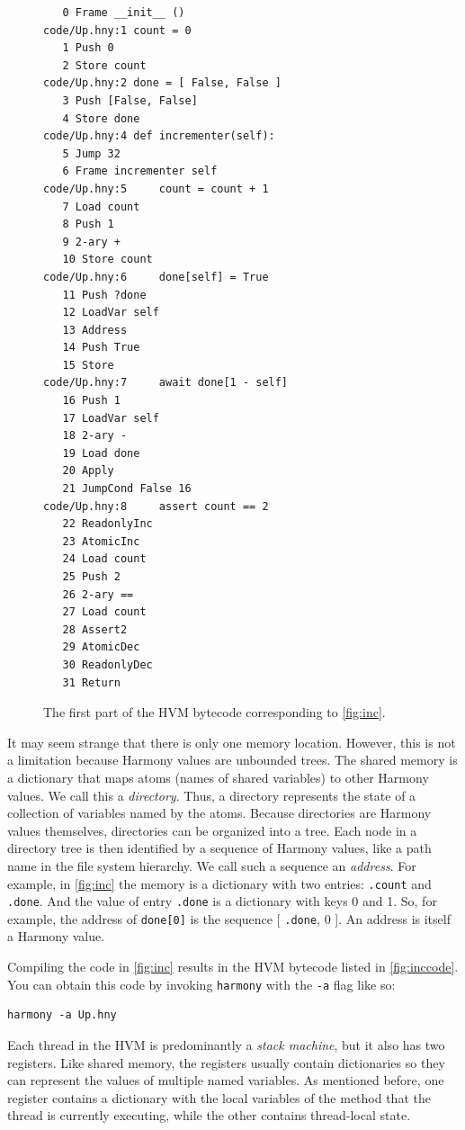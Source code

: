 \documentclass{report}
\newenvironment{code}{
\tcolorbox
}{
\endtcolorbox
}
\begin{document}
\begin{figure}
\begin{code}
\begin{verbatim}
   0 Frame __init__ ()
code/Up.hny:1 count = 0
   1 Push 0
   2 Store count
code/Up.hny:2 done = [ False, False ]
   3 Push [False, False]
   4 Store done
code/Up.hny:4 def incrementer(self):
   5 Jump 32
   6 Frame incrementer self
code/Up.hny:5     count = count + 1
   7 Load count
   8 Push 1
   9 2-ary +
   10 Store count
code/Up.hny:6     done[self] = True
   11 Push ?done
   12 LoadVar self
   13 Address
   14 Push True
   15 Store
code/Up.hny:7     await done[1 - self]
   16 Push 1
   17 LoadVar self
   18 2-ary -
   19 Load done
   20 Apply
   21 JumpCond False 16
code/Up.hny:8     assert count == 2
   22 ReadonlyInc
   23 AtomicInc
   24 Load count
   25 Push 2
   26 2-ary ==
   27 Load count
   28 Assert2
   29 AtomicDec
   30 ReadonlyDec
   31 Return
\end{verbatim}
\end{code}
\caption{The first part of the HVM bytecode corresponding to \autoref{fig:inc}.}
\label{fig:inccode}
\end{figure}

It may seem strange that there is only one memory location.
However, this is not a limitation because Harmony values are unbounded trees.
The shared memory is a dictionary that maps atoms (names of shared
variables) to other Harmony values.
We call this a \emph{directory}.
%
Thus, a directory represents the state of a collection of variables named
by the atoms.
%
Because directories are Harmony values themselves,
directories can be organized into a tree.
Each node in a directory tree is then identified
by a sequence of Harmony values, like a path name in the file system
hierarchy.  We call such a sequence an \emph{address}.
%
For example, in \autoref{fig:inc} the memory is a dictionary with two
entries: \texttt{.count} and \texttt{.done}.  And the value of entry
\texttt{.done} is a dictionary with keys 0 and 1.
So, for example, the address of \texttt{done[0]} is the sequence
[ \texttt{.done}, 0 ].
An address is itself a Harmony value.

%

Compiling the code in \autoref{fig:inc} results in the HVM bytecode
listed in \autoref{fig:inccode}.
You can obtain this code by invoking \texttt{harmony} with the \texttt{-a} flag
like so:
\begin{code}
\begin{verbatim}
harmony -a Up.hny
\end{verbatim}
\end{code}
Each thread in the HVM is predominantly a \emph{stack machine},
%
but it also has two registers.
Like shared memory, the registers usually contain dictionaries so they
can represent the values of multiple named variables.
As mentioned before, one register contains a dictionary with the local
variables of the method that the thread is currently executing,
while the other contains thread-local state.
\end{document}
